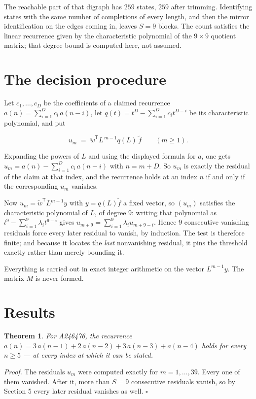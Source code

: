 \documentclass[11pt]{article}
\newtheorem{theorem}{Theorem}
\theoremstyle{definition}
\begin{document}
The reachable part of that digraph has $259$ states, $259$ after trimming. Identifying states with the same number of completions of every length, and then the mirror identification on the edges coming in, leaves $S = 9$ blocks. The count satisfies the linear recurrence given by the characteristic polynomial of the $9\times9$ quotient matrix; that degree bound is computed here, not assumed.

\section{The decision procedure}

Let $c_1,\dots,c_D$ be the coefficients of a claimed recurrence $a(n) = \sum_{i=1}^{D} c_i\,a(n-i)$, let $q(t) = t^{D} - \sum_{i=1}^{D} c_i t^{D-i}$ be its characteristic polynomial, and put

\[u_m \;=\; \tilde w^{\mathsf T} L^{\,m-1} q(L)\,\tilde f \qquad (m \ge 1).\]

Expanding the powers of $L$ and using the displayed formula for $a$, one gets $u_m = a(n) - \sum_{i=1}^{D} c_i\,a(n-i)$ with $n = m + D$. So $u_m$ is exactly the residual of the claim at that index, and the recurrence holds at an index $n$ if and only if the corresponding $u_m$ vanishes.

Now $u_m = \tilde w^{\mathsf T} L^{m-1} y$ with $y = q(L)\tilde f$ a fixed vector, so $(u_m)$ satisfies the characteristic polynomial of $L$, of degree $9$: writing that polynomial as $t^{9} - \sum_{i=1}^{9} \lambda_i t^{9-i}$ gives $u_{m+9} = \sum_{i=1}^{9} \lambda_i u_{m+9-i}$. Hence $9$ consecutive vanishing residuals force every later residual to vanish, by induction. The test is therefore finite; and because it locates the {\itshape last} nonvanishing residual, it pins the threshold exactly rather than merely bounding it.

Everything is carried out in exact integer arithmetic on the vector $L^{m-1}y$. The matrix $M$ is never formed.

\section{Results}

\begin{theorem} For A246476, the recurrence $a(n) = 3\,a(n-1) + 2\,a(n-2) + 3\,a(n-3) + a(n-4)$ holds for every $n \ge 5$ --- at every index at which it can be stated.\end{theorem}

{\itshape Proof.} The residuals $u_m$ were computed exactly for $m = 1,\dots,39$. Every one of them vanished. After it, more than $S = 9$ consecutive residuals vanish, so by Section 5 every later residual vanishes as well. $\square$
\end{document}
